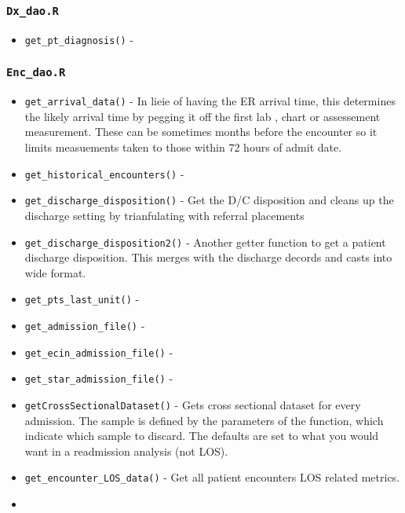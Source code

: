 \documentclass[
]{book}
\providecommand{\tightlist}{%
  \setlength{\itemsep}{0pt}\setlength{\parskip}{0pt}}
\begin{document}
\hypertarget{dx_dao.r}{%
\subsubsection{\texorpdfstring{\texttt{Dx\_dao.R}}{Dx\_dao.R}}\label{dx_dao.r}}

\begin{itemize}
\tightlist
\item
  \texttt{get\_pt\_diagnosis()} -
\end{itemize}

\hypertarget{enc_dao.r}{%
\subsubsection{\texorpdfstring{\texttt{Enc\_dao.R}}{Enc\_dao.R}}\label{enc_dao.r}}

\begin{itemize}
\tightlist
\item
  \texttt{get\_arrival\_data()} - In lieie of having the ER arrival time, this determines the likely arrival time by pegging it off the first lab , chart or assessement measurement. These can be sometimes months before the encounter so it limits measuements taken to those within 72 hours of admit date.
\item
  \texttt{get\_historical\_encounters()} -
\item
  \texttt{get\_discharge\_disposition()} - Get the D/C disposition and cleans up the discharge setting by trianfulating with referral placements
\item
  \texttt{get\_discharge\_disposition2()} - Another getter function to get a patient discharge disposition. This merges with the discharge decords and casts into wide format.
\item
  \texttt{get\_pts\_last\_unit()} -
\item
  \texttt{get\_admission\_file()} -
\item
  \texttt{get\_ecin\_admission\_file()} -
\item
  \texttt{get\_star\_admission\_file()} -
\item
  \texttt{getCrossSectionalDataset()} - Gets cross sectional dataset for every admission. The sample is defined by the parameters of the function, which indicate which sample to discard. The defaults are set to what you would want in a readmission analysis (not LOS).
\item
  \texttt{get\_encounter\_LOS\_data()} - Get all patient encounters LOS related metrics.
\item

\end{itemize}
\end{document}

